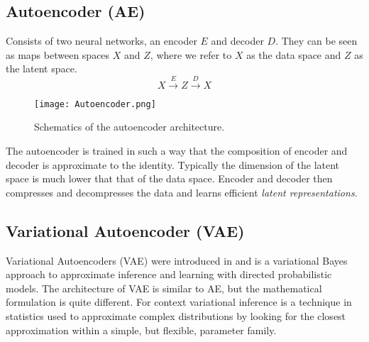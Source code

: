 \documentclass[../../thesis.tex]{subfiles}
\begin{document}
\subsection{Autoencoder (AE)}

Consists of two neural networks, an encoder $E$ and decoder $D$. They can be seen as maps between spaces $X$ and $Z$, where we refer to $X$ as the data space and $Z$ as the latent space. 
\begin{equation}
    X \xrightarrow{E} Z \xrightarrow{D} X 
\end{equation}

\begin{figure}[h]
    \texttt{[image: Autoencoder.png]}
    \centering
    \caption{Schematics of the autoencoder architecture.}
    \label{fig:autoencoder}
\end{figure}

The autoencoder is trained in such a way that the composition of encoder and decoder is approximate to the identity. Typically the dimension of the latent space is much lower that that of the data space. Encoder and decoder then compresses and decompresses the data and learns efficient \textit{latent representations}. 

\subsection{Variational Autoencoder (VAE)}
Variational Autoencoders (VAE) were introduced in \cite{kingma2022autoencoding} and is a variational Bayes approach to approximate inference and learning with directed probabilistic models. The architecture of VAE is similar to AE, but the mathematical formulation is quite different. For context variational inference is a technique in statistics used to approximate complex distributions by looking for the closest approximation within a simple, but flexible, parameter family. \newline 

\end{document}
